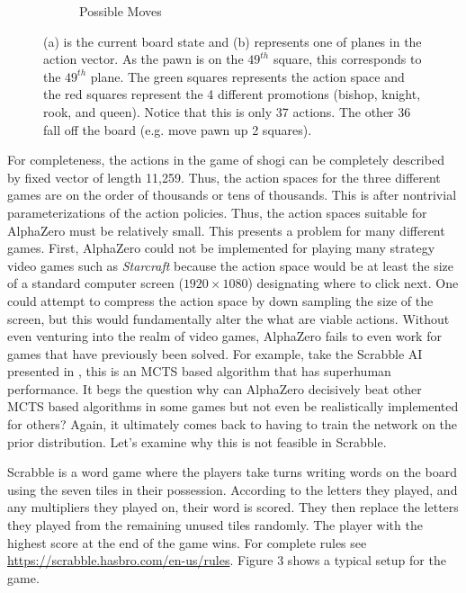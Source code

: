 \documentclass{article}
\begin{document}
\begin{figure}[H]
\begin{subfigure}[h]{0.48\linewidth}
      \caption{Possible Moves}
    \end{subfigure}%
    \caption[Example of chess action vector]{(a) is the current board state and (b) represents one of planes in the action vector. As the pawn is on the $49^{th}$ square, this corresponds to the $49^{th}$ plane. The green squares represents the action space and the red squares represent the 4 different promotions (bishop, knight, rook, and queen). Notice that this is only 37 actions. The other 36 fall off the board (e.g. move pawn up 2 squares).}
  \end{figure}

  For completeness, the actions in the game of shogi can be completely described by fixed vector of length 11,259. Thus, the action spaces for the three different games are on the order of thousands or tens of thousands. This is after nontrivial parameterizations of the action policies. Thus, the action spaces suitable for AlphaZero must be relatively small. This presents a problem for many different games. First, AlphaZero could not be implemented for playing many strategy video games such as \textit{Starcraft} because the action space would be at least the size of a standard computer screen ($1920 \times 1080$) designating where to click next. One could attempt to compress the action space by down sampling the size of the screen, but this would fundamentally alter the what are viable actions. Without even venturing into the realm of video games, AlphaZero fails to even work for games that have previously been solved. For example, take the Scrabble AI presented in \cite{sheppard_world-championship-caliber_2002}, this is an MCTS based algorithm that has superhuman performance. It begs the question why can AlphaZero decisively beat other MCTS based algorithms in some games but not even be realistically implemented for others? Again, it ultimately comes back to having to train the network on the prior distribution. Let's examine why this is not feasible in Scrabble.

  Scrabble is a word game where the players take turns writing words on the board using the seven tiles in their possession. According to the letters they played, and any multipliers they played on, their word is scored. They then replace the letters they played from the remaining unused tiles randomly. The player with the highest score at the end of the game wins. For complete rules see \url{https://scrabble.hasbro.com/en-us/rules}. Figure 3 shows a typical setup for the game.
\end{document}

